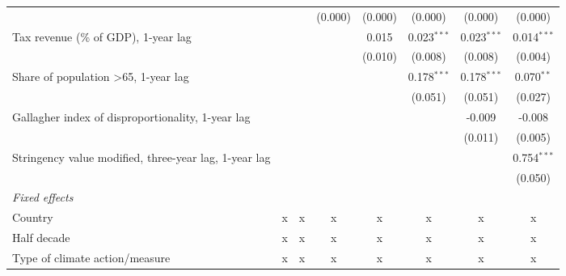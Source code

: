 \begin{tabular}{lccccccc}
                                                                    &               &              & (0.000)       & (0.000)      & (0.000)       & (0.000)       & (0.000)\\   
   Tax revenue (\% of GDP), 1-year lag                              &               &              &               & 0.015        & 0.023$^{***}$ & 0.023$^{***}$ & 0.014$^{***}$\\   
                                                                    &               &              &               & (0.010)      & (0.008)       & (0.008)       & (0.004)\\   
   Share of population >65, 1-year lag                              &               &              &               &              & 0.178$^{***}$ & 0.178$^{***}$ & 0.070$^{**}$\\   
                                                                    &               &              &               &              & (0.051)       & (0.051)       & (0.027)\\   
   Gallagher index of disproportionality, 1-year lag                &               &              &               &              &               & -0.009        & -0.008\\   
                                                                    &               &              &               &              &               & (0.011)       & (0.005)\\   
   Stringency value modified, three-year lag, 1-year lag            &               &              &               &              &               &               & 0.754$^{***}$\\   
                                                                    &               &              &               &              &               &               & (0.050)\\   
   \emph{Fixed effects}\\
   Country                                                          & x             & x            & x             & x            & x             & x             & x\\  
   Half decade                                                      & x             & x            & x             & x            & x             & x             & x\\  
   Type of climate action/measure                                   & x             & x            & x             & x            & x             & x             & x\\  

\end{tabular}
